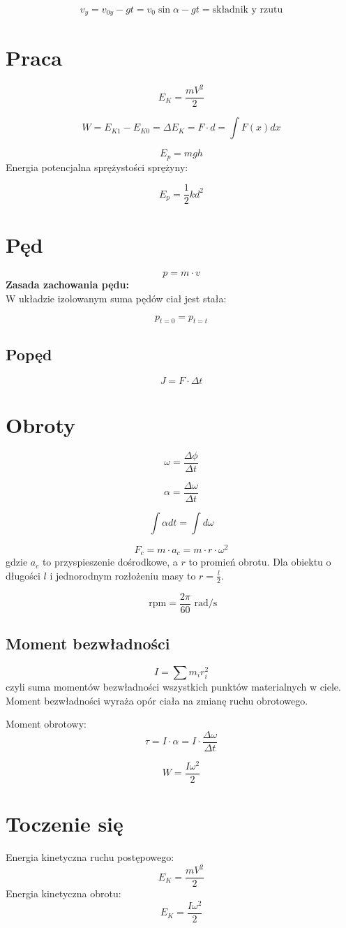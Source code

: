 \documentclass{../notatki}
\begin{document}
$$
v_y = v_{0y} - gt = v_0 \sin \alpha - gt = \text{składnik y rzutu}
$$

\section{Praca}

$$
E_K = \frac{mV^2}{2}
$$

$$
W = E_{K1} - E_{K0} = \Delta E_K = F \cdot d = \int F(x) dx
$$

$$
E_p = mgh
$$
Energia potencjalna sprężystości sprężyny:

$$
E_p = \frac{1}{2}kd^2
$$

\section{Pęd}

$$
p = m \cdot v
$$
\textbf{Zasada zachowania pędu:}\\
W układzie izolowanym suma pędów ciał jest stała:

$$
p_{t=0} = p_{t=t}
$$

\subsection{Popęd}

$$
J = F \cdot \Delta t
$$

\section{Obroty}

$$
\omega = \frac{\Delta \phi}{\Delta t}
$$

$$
\alpha = \frac{\Delta \omega}{\Delta t}
$$

$$
\int \alpha dt = \int d\omega
$$

$$
F_c = m \cdot a_c = m \cdot r \cdot \omega^2
$$
gdzie $a_c$ to przyspieszenie dośrodkowe, a $r$ to promień obrotu. Dla obiektu
o długości $l$ i jednorodnym rozłożeniu masy to $r = \frac{l}{2}$.

$$
\text{ rpm} = \frac{2\pi}{60} \text{ rad/s}
$$

\subsection{Moment bezwładności}

$$
I = \sum m_i r_i^2
$$
czyli suma momentów bezwładności wszystkich punktów materialnych w ciele.
Moment bezwładności wyraża opór ciała na zmianę ruchu obrotowego.

Moment obrotowy:
$$
\tau = I \cdot \alpha = I \cdot \frac{\Delta \omega}{\Delta t}
$$

$$
W = \frac{I\omega^2}{2}
$$

\section{Toczenie się}

Energia kinetyczna ruchu postępowego:
$$
E_K = \frac{mV^2}{2}
$$
Energia kinetyczna obrotu:
$$
E_K = \frac{I\omega^2}{2}
$$
\end{document}
